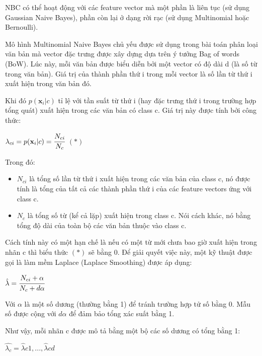 \documentclass[12pt,a4paper,oneside]{book}
\begin{document}
			NBC có thể hoạt động với các feature vector mà một phần là liên tục (sử dụng Gaussian Naive Bayes), phần còn lại ở dạng rời rạc (sử dụng Multinomial hoặc Bernoulli).

			Mô hình Multinomial Naive Bayes chủ yếu được sử dụng trong bài toán phân loại văn bản mà vector đặc trưng được xây dựng dựa trên ý tưởng Bag of words (BoW). Lúc này, mỗi văn bản được biểu diễn bởi một vector có độ dài d (là số từ trong văn bản). Giá trị của thành phần thứ i trong mỗi vector là số lần từ thứ i xuất hiện trong văn bản đó.

			Khi đó $p(\textbf{x}_i|c)$ tỉ lệ với tần suất từ thứ i (hay đặc trưng thứ i trong trường hợp tổng quát) xuất hiện trong các văn bản có class c. Giá trị này được tính bởi công thức:
			
			\begin{center}
				$\lambda_{ci} = p(\textbf{x}_i|c) = \cfrac{N_{ci}}{N_c}$    $(*)$
			\end{center}
			
			Trong đó:
			
			\begin{itemize}
				\item $N_{ci}$ là tổng số lần từ thứ i xuất hiện trong các văn bản của class c, nó được tính là tổng của tất cả các thành phần thứ i của các feature vectors ứng với class c.
				\item $N_c$ là tổng số từ (kể cả lặp) xuất hiện trong class c. Nói cách khác, nó bằng tổng độ dài của toàn bộ các văn bản thuộc vào class c.
			\end{itemize}
			
			Cách tính này có một hạn chế là nếu có một từ mới chưa bao giờ xuất hiện trong nhãn c thì biểu thức $(*)$ sẽ bằng 0. Để giải quyết việc này, một kỹ thuật được gọi là làm mềm Laplace (Laplace Smoothing) được áp dụng:
			
			\begin{center}
				$\hat{\lambda}=\cfrac{N_{ci}+\alpha}{N_c+d\alpha}$
			\end{center}
			
			Với $\alpha$ là một số dương (thường bằng 1) để tránh trường hợp tử số bằng 0. Mẫu số được cộng với $d\alpha$ để đảm bảo tổng xác suất bằng 1.
			
			Như vậy, mỗi nhãn c được mô tả bằng một bộ các số dương có tổng bằng 1:
			
			\begin{center}
				$\hat{\lambda_c}=\hat{\lambda}c1,..., \hat{\lambda}cd$
			\end{center}
\end{document}
